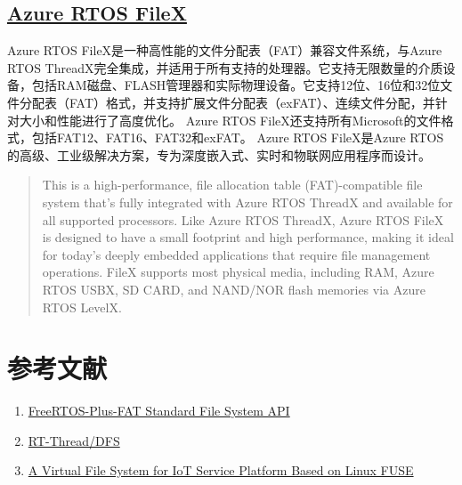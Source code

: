\documentclass[UTF8,a4paper]{ctexart}
\begin{document}
\subsection{\href{https://github.com/azure-rtos/filex}{Azure RTOS FileX}}
	Azure RTOS FileX是一种高性能的文件分配表（FAT）兼容文件系统，与Azure RTOS ThreadX完全集成，并适用于所有支持的处理器。它支持无限数量的介质设备，包括RAM磁盘、FLASH管理器和实际物理设备。它支持12位、16位和32位文件分配表（FAT）格式，并支持扩展文件分配表（exFAT）、连续文件分配，并针对大小和性能进行了高度优化。
	Azure RTOS FileX还支持所有Microsoft的文件格式，包括FAT12、FAT16、FAT32和exFAT。
	Azure RTOS FileX是Azure RTOS的高级、工业级解决方案，专为深度嵌入式、实时和物联网应用程序而设计。
	\begin{quote}
		This is a high-performance, file allocation table (FAT)-compatible file system that's fully integrated with Azure RTOS ThreadX and available for all supported processors. 
        Like Azure RTOS ThreadX, Azure RTOS FileX is designed to have a small footprint and high performance, making it ideal for today's deeply embedded applications that require file management operations. 
        FileX supports most physical media, including RAM, Azure RTOS USBX, SD CARD, and NAND/NOR flash memories via Azure RTOS LevelX.
	\end{quote}

\section{参考文献}
\begin{enumerate}
	\item \href{https://www.freertos.org/zh-cn-cmn-s/FreeRTOS-Plus/FreeRTOS_Plus_FAT/Standard_File_System_API.html}{FreeRTOS-Plus-FAT Standard File System API}
	\item \href{https://www.rt-thread.org/document/site/\#/rt-thread-version/rt-thread-standard/programming-manual/filesystem/filesystem}{RT-Thread/DFS}
	\item \href{run:./ref/Modular Integration of Crashsafe Caching into a Verified Virtual File System Switch.pdf}{A Virtual File System for IoT Service Platform Based on Linux FUSE}
\end{enumerate}
\end{document}
